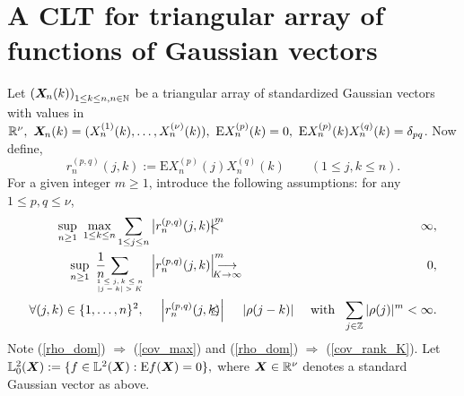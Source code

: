 \documentclass[10pt]{article}
\def\N{\mathbb{N}}
\def\L{\mathbb{L}}
\def\R{\mathbb{R}}
\def\Z{\mathbb{Z}}
\def\E{\mathrm E}
\newcommand{\mbf}[1]{\mbox{\boldmath $#1$}}
\def\limiteK{\renewcommand{\arraystretch}{0.5}
\begin{array}[t]{c}
\stackrel{}{\longrightarrow} \\
{\scriptstyle K \rightarrow\infty}
\end{array}\renewcommand{\arraystretch}{1}}
\begin{document}
\section{A CLT for triangular array of functions of Gaussian vectors} \label{Section_CLT}
Let $\left({\mbf
X}_{\! n}(k) \right)_{1\le k \le n, n \in {\N}} $ be a  triangular
array of standardized Gaussian vectors with values in ${\R}^\nu, \
{\mbf X}_{\! n}(k) = (X^{(1)}_n(k), \dots, X^{(\nu)}_n(k)), \  \E
X^{(p)}_n(k) = 0, \  \E X^{(p)}_n(k) X^{(q)}_n(k) = \delta_{pq}$.
Now define,
$$
r^{(p,q)}_n(j,k) :=  \E X^{(p)}_n(j) X^{(q)}_n(k)  \qquad (1 \le
j, k \le n).
$$
For a given integer $m\ge 1$, introduce the following assumptions:
for any $1\le p, q \le \nu$,
\begin{eqnarray}
\sup_{n \ge 1} ~ \max_{1\le k \le n} \sum_{1 \leq j \leq n} \big|
r^{(p,q)}_n(j,k)\big|^m \hspace{-5mm} &<& \hspace{-5mm} \infty,
\label{cov_max} \\
\sup_{n \ge 1} ~ \frac 1 n \hspace{-0.5cm} \sum_{\tiny
\begin{array}{c}
 1\le j,k \le n
\\
 |j-k| >K\end{array}} \left|r^{(p,q)}_n(j,k) \right|^m \hspace{-5mm} &\limiteK& \hspace{-5mm} 0,
 \label{cov_rank_K} \\
\forall (j, k)\in \{1,\ldots,n\}^2,~~~~\left|
r^{(p,q)}_n(j,k)\right| \hspace{-5mm} &\le&
\hspace{-5mm}|\rho(j-k)|~~~~\mbox{with} ~~\sum_{j\in {\Z}}
|\rho(j)|^m < \infty. \label{rho_dom}
\end{eqnarray}
Note (\ref{rho_dom}) $\Rightarrow$ (\ref{cov_max}) and (\ref{rho_dom})
$\Rightarrow$ (\ref{cov_rank_K}). Let $\L^2_0({\mbf X}) := \{f
\in \L^2({\mbf X}): \E f({\mbf X}) = 0\}, $ where ${\mbf X}\in \R^\nu$ denotes a standard Gaussian vector as above. 
\end{document}
